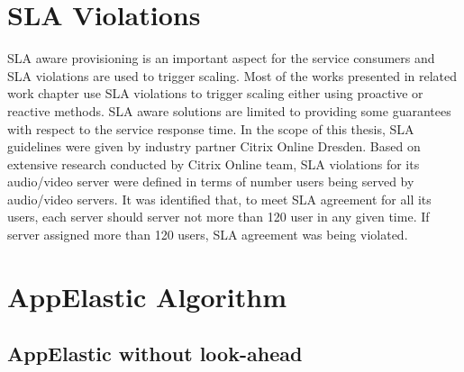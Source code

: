 \section{SLA Violations}
\label{sec:SLA Violations}
SLA aware provisioning is an important aspect for the service consumers and SLA violations are used to trigger scaling. Most of the works presented in related work chapter use SLA violations to trigger scaling either using proactive or reactive methods. SLA aware solutions are limited to providing some guarantees with respect to the service response time. In the scope of this thesis, SLA guidelines were given by industry partner Citrix Online Dresden. Based on extensive research conducted by Citrix Online team, SLA violations for its audio/video server were defined in terms of number users being served by audio/video servers. It was identified that, to meet SLA agreement for all its users, each server should server not more than 120 user in any given time. If server assigned more than 120 users, SLA agreement was being violated.

\section{AppElastic Algorithm}
\label{sec:AppElastic Algorithm}

\subsection{AppElastic without look-ahead}
\label{sub:AppElastic without look-ahead}

